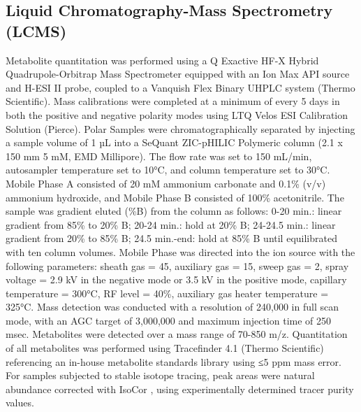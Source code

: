 \subsection{Liquid Chromatography-Mass Spectrometry (LCMS)}
Metabolite quantitation was performed using a Q Exactive HF-X Hybrid Quadrupole-Orbitrap Mass Spectrometer equipped with an Ion Max API source and H-ESI II probe, coupled to a Vanquish Flex Binary UHPLC system (Thermo Scientific).
Mass calibrations were completed at a minimum of every 5 days in both the positive and negative polarity modes using LTQ Velos ESI Calibration Solution (Pierce).
Polar Samples were chromatographically separated by injecting a sample volume of 1 µL into a SeQuant ZIC-pHILIC Polymeric column (2.1 x 150 mm 5 mM, EMD Millipore).
The flow rate was set to 150 mL/min, autosampler temperature set to 10°C, and column temperature set to 30°C.
Mobile Phase A consisted of 20 mM ammonium carbonate and 0.1\% (v/v) ammonium hydroxide, and Mobile Phase B consisted of 100\% acetonitrile.
The sample was gradient eluted (\%B) from the column as follows: 0-20 min.: linear gradient from 85\% to 20\% B; 20-24 min.: hold at 20\% B; 24-24.5 min.: linear gradient from 20\% to 85\% B; 24.5 min.-end: hold at 85\% B until equilibrated with ten column volumes.
Mobile Phase was directed into the ion source with the following parameters: sheath gas = 45, auxiliary gas = 15, sweep gas = 2, spray voltage = 2.9 kV in the negative mode or 3.5 kV in the positive mode, capillary temperature = 300°C, RF level = 40\%, auxiliary gas heater temperature = 325°C.
Mass detection was conducted with a resolution of 240,000 in full scan mode, with an AGC target of 3,000,000 and maximum injection time of 250 msec.
Metabolites were detected over a mass range of 70-850 m/z.
Quantitation of all metabolites was performed using Tracefinder 4.1 (Thermo Scientific) referencing an in-house metabolite standards library using ≤5 ppm mass error.
For samples subjected to stable isotope tracing, peak areas were natural abundance corrected with IsoCor \cite{Millard2019-hv}, using experimentally determined tracer purity values.




